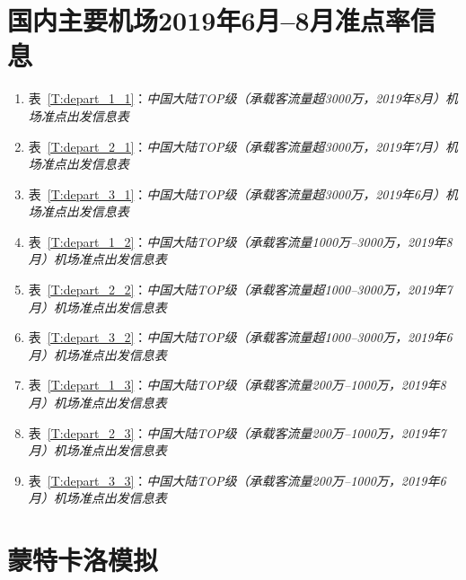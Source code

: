 \section{国内主要机场2019年6月--8月准点率信息}
    \begin{enumerate}[label=(\arabic*)]
        \item 表~\ref{T:depart_1_1}：\emph{中国大陆TOP级（承载客流量超3000万，2019年8月）机场准点出发信息表}
        \item 表~\ref{T:depart_2_1}：\emph{中国大陆TOP级（承载客流量超3000万，2019年7月）机场准点出发信息表}
        \item 表~\ref{T:depart_3_1}：\emph{中国大陆TOP级（承载客流量超3000万，2019年6月）机场准点出发信息表}
        \item 表~\ref{T:depart_1_2}：\emph{中国大陆TOP级（承载客流量1000万--3000万，2019年8月）机场准点出发信息表}
        \item 表~\ref{T:depart_2_2}：\emph{中国大陆TOP级（承载客流量超1000--3000万，2019年7月）机场准点出发信息表}
        \item 表~\ref{T:depart_3_2}：\emph{中国大陆TOP级（承载客流量超1000--3000万，2019年6月）机场准点出发信息表}
        \item 表~\ref{T:depart_1_3}：\emph{中国大陆TOP级（承载客流量200万--1000万，2019年8月）机场准点出发信息表}
        \item 表~\ref{T:depart_2_3}：\emph{中国大陆TOP级（承载客流量200万--1000万，2019年7月）机场准点出发信息表}
        \item 表~\ref{T:depart_3_3}：\emph{中国大陆TOP级（承载客流量200万--1000万，2019年6月）机场准点出发信息表}
    \end{enumerate}
    
    



\section{蒙特卡洛模拟}\label{A:python-simulink}
